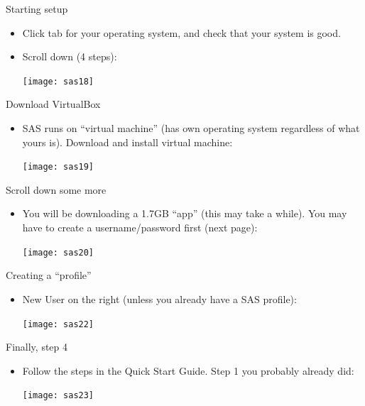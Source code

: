 \documentclass[unknownkeysallowed]{beamer}\usepackage[]{graphicx}\usepackage[]{color}
\begin{document}
\begin{frame}[fragile]{Starting setup}
  
  \begin{itemize}
  \item Click tab for your operating system, and check that your
    system is good.
  \item Scroll down (4 steps):
    
    \texttt{[image: sas18]}
    
  \end{itemize}
  
\end{frame}

\begin{frame}[fragile]{Download VirtualBox}
  
  \begin{itemize}
  \item SAS runs on ``virtual machine'' (has own operating system
    regardless of what yours is). Download and install virtual machine:
    
    \texttt{[image: sas19]}
  \end{itemize}
  
\end{frame}


\begin{frame}[fragile]{Scroll down some more}
  
  \begin{itemize}
  \item You will be downloading a 1.7GB ``app'' (this may take a while). You may
    have to create a username/password first (next page):
    
    \texttt{[image: sas20]}
  \end{itemize}
  
  
\end{frame}

\begin{frame}[fragile]{Creating a ``profile''}
  
  \begin{itemize}
  \item New User on the right (unless you already have a SAS profile):

      \texttt{[image: sas22]}

  \end{itemize}
  
  
\end{frame}

\begin{frame}[fragile]{Finally, step 4}
  
  \begin{itemize}
  \item Follow the steps in the Quick Start Guide. Step 1 you probably
    already did:
    
    \texttt{[image: sas23]}
  \end{itemize}
  
\end{frame}
\end{document}

